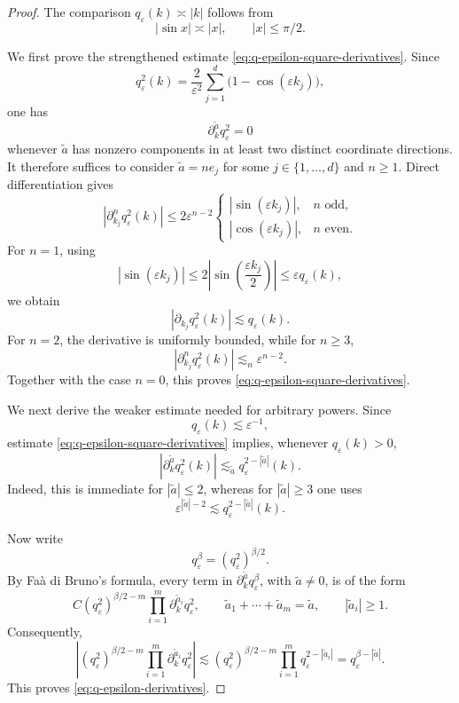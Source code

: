 \documentclass{article}
\numberwithin{equation}{section}
\theoremstyle{plain}
\theoremstyle{definition}
\begin{document}
\begin{proof}
	The comparison \(q_\varepsilon(k)\asymp|k|\) follows from
	\[
	|\sin x|\asymp|x|,
	\qquad |x|\leqslant\pi/2.
	\]
	
	We first prove the strengthened estimate
	\eqref{eq:q-epsilon-square-derivatives}. Since
	\[
	q_\varepsilon^2(k)
	=
	\frac2{\varepsilon^2}
	\sum_{j=1}^d
	\bigl(1-\cos(\varepsilon k_j)\bigr),
	\]
	one has
	\[
	\partial_k^{\tilde a}q_\varepsilon^2=0
	\]
	whenever \(\tilde a\) has nonzero components in at least two
	distinct coordinate directions. It therefore suffices to consider
	\(\tilde a=ne_j\) for some \(j\in\{1,\ldots,d\}\) and \(n\geqslant1\).
	Direct differentiation gives
	\[
	\left|
	\partial_{k_j}^n q_\varepsilon^2(k)
	\right|
	\leqslant
	2\varepsilon^{n-2}
	\begin{cases}
		|\sin(\varepsilon k_j)|,
		& n \text{ odd},\\
		|\cos(\varepsilon k_j)|,
		& n \text{ even}.
	\end{cases}
	\]
	For \(n=1\), using
	\[
	|\sin(\varepsilon k_j)|
	\leqslant
	2\left|
	\sin\left(\frac{\varepsilon k_j}{2}\right)
	\right|
	\leqslant
	\varepsilon q_\varepsilon(k),
	\]
	we obtain
	\[
	\left|
	\partial_{k_j}q_\varepsilon^2(k)
	\right|
	\lesssim q_\varepsilon(k).
	\]
	For \(n=2\), the derivative is uniformly bounded, while for
	\(n\geqslant3\),
	\[
	\left|
	\partial_{k_j}^n q_\varepsilon^2(k)
	\right|
	\lesssim_n\varepsilon^{n-2}.
	\]
	Together with the case \(n=0\), this proves
	\eqref{eq:q-epsilon-square-derivatives}.
	
	We next derive the weaker estimate needed for arbitrary powers.
	Since
	\[
	q_\varepsilon(k)\lesssim\varepsilon^{-1},
	\]
	estimate \eqref{eq:q-epsilon-square-derivatives} implies, whenever
	\(q_\varepsilon(k)>0\),
	\[
	\left|
	\partial_k^{\tilde a}q_\varepsilon^2(k)
	\right|
	\lesssim_{\tilde a}
	q_\varepsilon^{2-|\tilde a|}(k).
	\]
	Indeed, this is immediate for \(|\tilde a|\leqslant2\), whereas for
	\(|\tilde a|\geqslant3\) one uses
	\[
	\varepsilon^{|\tilde a|-2}
	\lesssim
	q_\varepsilon^{2-|\tilde a|}(k).
	\]
	
	Now write
	\[
	q_\varepsilon^\beta
	=
	(q_\varepsilon^2)^{\beta/2}.
	\]
	By Faà di Bruno's formula, every term in
	\(\partial_k^{\tilde a}q_\varepsilon^\beta\), with
	\(\tilde a\neq0\), is of the form
	\[
	C
	(q_\varepsilon^2)^{\beta/2-m}
	\prod_{i=1}^m
	\partial_k^{\tilde a_i}q_\varepsilon^2,
	\qquad
	\tilde a_1+\cdots+\tilde a_m=\tilde a,
	\qquad
	|\tilde a_i|\geqslant1.
	\]
	Consequently,
	\[
	\left|
	(q_\varepsilon^2)^{\beta/2-m}
	\prod_{i=1}^m
	\partial_k^{\tilde a_i}q_\varepsilon^2
	\right|
	\lesssim
	(q_\varepsilon^2)^{\beta/2-m}
	\prod_{i=1}^m
	q_\varepsilon^{2-|\tilde a_i|}
	=
	q_\varepsilon^{\beta-|\tilde a|}.
	\]
	This proves \eqref{eq:q-epsilon-derivatives}.
	

\end{proof}
\end{document}

